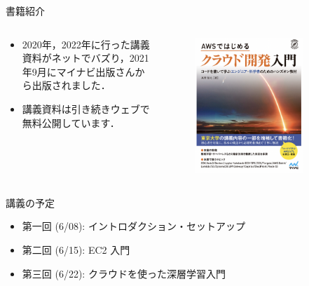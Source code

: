 \documentclass[unicode,11pt]{beamer}
\begin{document}
\begin{frame}{書籍紹介}

\begin{columns}
    \begin{column}{0.47\textwidth}
        \begin{itemize}
            \item 2020年，2022年に行った講義資料がネットでバズり，2021年9月にマイナビ出版さんから出版されました．
            \item 講義資料は引き続きウェブで無料公開しています．
        \end{itemize}
    \end{column}
    \begin{column}{0.5\textwidth}
        \begin{figure}
            \centering
            \includegraphics[width=0.8\textwidth]{cover.png}
        \end{figure}
    \end{column}
\end{columns}

\end{frame}

\begin{frame}{講義の予定}
    \begin{itemize}
        \item 第一回 (6/08): イントロダクション・セットアップ
        \item 第二回 (6/15): EC2 入門
        \item 第三回 (6/22): クラウドを使った深層学習入門
    \end{itemize}
\end{frame}
\end{document}
